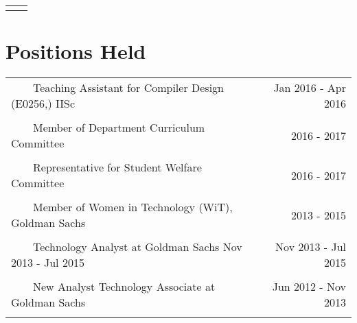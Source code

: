 \documentclass[a4paper,10pt]{article} %
\newcommand{\tabitem}{~~\llap{\textbullet}~~}
\begin{document}
\begin{tabular}{rp{13cm}}
& \\
\end{tabular}


\section{Positions Held}

\begin{tabular}{p{12cm}r}
\tabitem Teaching Assistant for Compiler Design (E0256,) IISc  & Jan 2016 - Apr 2016 \\
&\\
\tabitem Member of Department Curriculum Committee &  2016 - 2017\\
&\\
\tabitem Representative for Student Welfare Committee  & 2016 - 2017\\
&\\
\tabitem Member of Women in Technology (WiT), Goldman Sachs  & 2013 - 2015\\
&\\
\tabitem Technology Analyst at Goldman Sachs Nov 2013 - Jul 2015 & Nov 2013 - Jul 2015 \\
&\\
\tabitem New Analyst Technology Associate at Goldman Sachs & Jun 2012 - Nov 2013 \\
&\\
\end{tabular}


\end{document}
